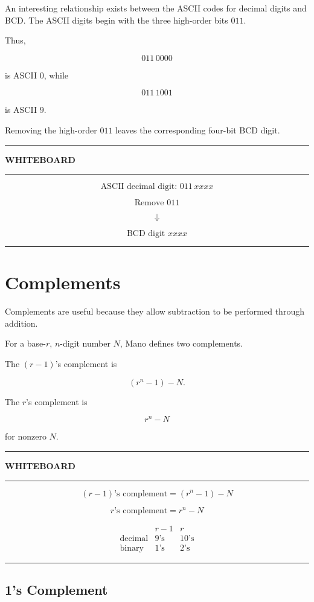 \documentclass[11pt]{article}
\newenvironment{whiteboard}
{
    \par\medskip
    \begin{center}
    \begin{minipage}{0.94\textwidth}
    \hrule
    \vspace{0.4em}
    \textbf{\large WHITEBOARD}
    \vspace{0.3em}
    \hrule
    \vspace{0.7em}
}
{
    \vspace{0.5em}
    \hrule
    \end{minipage}
    \end{center}
    \medskip
}
\begin{document}
An interesting relationship exists between the ASCII codes for decimal digits
and BCD. The ASCII digits begin with the three high-order bits \(011\).

Thus,

\[
011\,0000
\]

is ASCII \(0\), while

\[
011\,1001
\]

is ASCII \(9\).

Removing the high-order \(011\) leaves the corresponding four-bit BCD digit.

\begin{whiteboard}
\[
\text{ASCII decimal digit: }011\,xxxx
\]

\[
\text{Remove }011
\]

\[
\Downarrow
\]

\[
\boxed{\text{BCD digit }xxxx}
\]
\end{whiteboard}

\section{Complements}

Complements are useful because they allow subtraction to be performed through
addition.

For a base-\(r\), \(n\)-digit number \(N\), Mano defines two complements.

The \((r-1)\)'s complement is

\[
(r^n-1)-N.
\]

The \(r\)'s complement is

\[
r^n-N
\]

for nonzero \(N\).

\begin{whiteboard}
\[
\boxed{(r-1)\text{'s complement}=(r^n-1)-N}
\]

\[
\boxed{r\text{'s complement}=r^n-N}
\]

\[
\begin{array}{c|c|c}
 & r-1 & r \\ \hline
\text{decimal} & 9\text{'s} & 10\text{'s}\\
\text{binary} & 1\text{'s} & 2\text{'s}
\end{array}
\]
\end{whiteboard}

\subsection{1's Complement}
\end{document}
